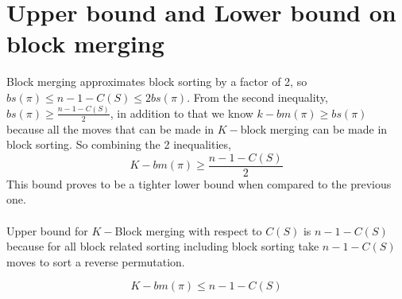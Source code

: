\documentclass[BTech]{iitmdiss}
\begin{document}
\section{Upper bound and Lower bound on block merging}
Block merging approximates block sorting by a factor of 2, so $bs(\pi) \leq n-1-C(S) \leq 2bs(\pi)$. From the second inequality, $bs(\pi) \geq \frac{n-1-C(S)}{2}$, in addition to that we know $k-bm(\pi) \geq bs(\pi)$ because all the moves that can be made in $K-$block merging can be made in block sorting. So combining the 2 inequalities,
$$K-bm(\pi) \geq \frac{n-1-C(S)}{2}$$
This bound proves to be a tighter lower bound when compared to the previous one.\\~\\
Upper bound for $K-$Block merging with respect to $C(S)$ is $n-1-C(S)$ because for all block related sorting including block sorting take $n-1-C(S)$ moves to sort a reverse permutation.

$$K-bm(\pi) \leq n-1-C(S)$$
\end{document}
